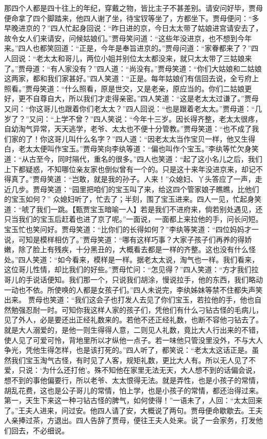 \documentclass[12pt,oneside]{book}
\begin{document}
那四个人都是四十往上的年纪，穿戴之物，皆比主子不甚差别。请安问好毕，贾母便命拿了四个脚踏来，他四人谢了坐，待宝钗等坐了，方都坐下。贾母便问：“多早晚进京的？”四人忙起身回说：“昨日进的京，今日太太带了姑娘进宫请安去了，故令女人们来请安，问候姑娘们。”贾母笑问道：“这些年没进京，也不想到今年来。”四人也都笑回道：“正是，今年是奉旨进京的。”贾母问道：“家眷都来了？”四人回说：“老太太和哥儿，两位小姐并别位太太都没来，就只太太带了三姑娘来了。”贾母道：“有人家没有？”四人道：“尚没有。”贾母笑道：“你们大姑娘和二姑娘这两家，都和我们家甚好。”四人笑道：“正是。每年姑娘们有信回去说，全亏府上照看。”贾母笑道：“什么照看，原是世交，又是老亲，原应当的。你们二姑娘更好，更不自尊自大，所以我们才走得亲密。”四人笑道：“这是老太太过谦了。”贾母又问：“你这哥儿也跟着你们老太太？”四人回说：“也是跟着老太太。”贾母道：“几岁了？”又问：“上学不曾？”四人笑说：“今年十三岁。因长得齐整，老太太很疼，自幼淘气异常，天天逃学，老爷、太太也不便十分管教。”贾母笑道：“也不成了我们家的了！你这哥儿叫什么名字？”四人道：“因老太太当作宝贝一样，他又生得白，老太太便叫作宝玉。”贾母笑向李纨等道：“偏也叫作个宝玉。”李纨等忙欠身笑道：“从古至今，同时隔代，重名的很多。”四人也笑道：“起了这小名儿之后，我们上下都疑惑，不知哪位亲友家也倒似曾有一个的。只是这十来年没进京来，却记不得真了。”贾母笑道：“岂敢，就是我的孙子。人来！”众媳妇、丫头答应了一声，走近几步。贾母笑道：“园里把咱们的宝玉叫了来，给这四个管家娘子瞧瞧，比他们的宝玉如何？”
众媳妇听了，忙去了；半刻，围了宝玉进来。四人一见，忙起身笑道：“唬了我们一跳。【甄贾宝玉暗喻一人】若是我们不进府来，倘若别处遇见，还只当我们的宝玉后赶着也进了京了呢。”一面说，一面都上来拉他的手，问长问短。宝玉忙也笑问好。贾母笑道：“比你们的长得如何？”李纨等笑道：“四位妈妈才一说，可知是模样相仿了。”贾母笑道：“哪有这样巧事？大家子孩子们再养的得娇嫩，除了脸上有残疾，十分黑丑的，大概看去都是一样的齐整。这也没有什么怪处。”四人笑道：“如今看来，模样是一样。据老太太说，淘气也一样。我们看来，这位哥儿性情，却比我们的好些。”贾母忙问：“怎见得？”四人笑道：“方才我们拉哥儿的手说话便知。我们那一个，只说我们胡涂，慢说拉手，他的东西，我们略动一动也不依。所使唤的人都是女孩子们。”四人未说完，李纨姊妹等禁不住都失声笑出来。
贾母也笑道：“我们这会子也打发人去见了你们宝玉，若拉他的手，他也自然勉强忍耐一时。可知你我这样人家的孩子们，凭他们有什么刁钻古怪的毛病儿，见了外人，必是要还出正经礼数来的。若他不还正经礼数，也断不容他刁钻去了。就是大人溺爱的，是他一则生得得人意，二则见人礼数，竟比大人行出来的不错，使人见了可爱可怜，背地里所以才纵他一点子。若一味他只管没里没外，不与大人争光，凭他生得怎样，也是该打死的。”四人听了，都笑说：“老太太这话正是。虽然我们宝玉淘气古怪，有时见了人客，规矩礼数，更比大人有。所以无人见了不爱，只说：‘为什么还打他’。殊不知他在家里无法无天，大人想不到的话偏会说，想不到的事他偏要行，所以老爷、太太恨得无法。就是弄性，也是小孩子的常情，胡乱花费，这也是公子哥儿的常情，怕上学，也是小孩子的常情，都还治得过来。第一，天生下来这一种刁钻古怪的脾气，如何使得！”一语未了，人回：“太太回来了。”王夫人进来，问过安。他四人请了安，大概说了两句。贾母便命歇歇去。王夫人亲捧过茶，方退出。四人告辞了贾母，便往王夫人处来。说了一会家务，打发他们回去，不必细说。
\end{document}

